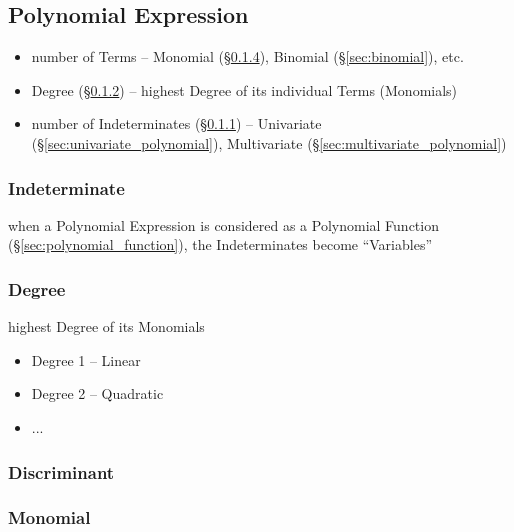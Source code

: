 \subsection{Polynomial Expression}\label{sec:polynomial_expression}

\begin{itemize}
  \item number of Terms -- Monomial (\S\ref{sec:monomial}), Binomial
    (\S\ref{sec:binomial}), etc.
  \item Degree (\S\ref{sec:degree}) -- highest Degree of its individual Terms
    (Monomials)
  \item number of Indeterminates (\S\ref{sec:indeterminate}) -- Univariate
    (\S\ref{sec:univariate_polynomial}), Multivariate
    (\S\ref{sec:multivariate_polynomial})
\end{itemize}



\subsubsection{Indeterminate}\label{sec:indeterminate}

when a Polynomial Expression is considered as a Polynomial Function
(\S\ref{sec:polynomial_function}), the Indeterminates become ``Variables''



\subsubsection{Degree}\label{sec:degree}

highest Degree of its Monomials

\begin{itemize}
  \item Degree 1 -- Linear
  \item Degree 2 -- Quadratic
  \item ...
\end{itemize}



\subsubsection{Discriminant}\label{sec:discriminant}

\subsubsection{Monomial}\label{sec:monomial}

